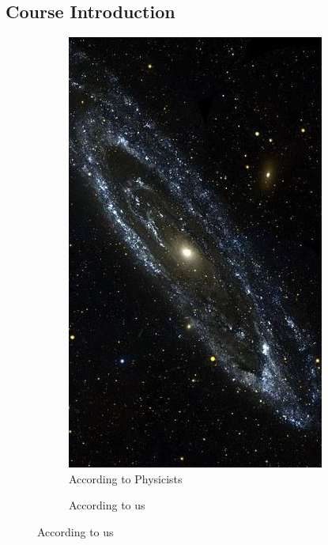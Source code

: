 \documentclass[]{article}
\begin{document}
\subsection{Course Introduction}
\begin{figure}[H]
	\caption{Our Universes}
	\begin{subfigure}[t]{0.45\textwidth}
		\caption{According to Physicists}
		\includegraphics[width=\textwidth]{universe1}
	\end{subfigure}
	\begin{subfigure}[t]{0.45\textwidth}
		\caption{According to us}

\end{subfigure}
\end{figure}
\end{document}
